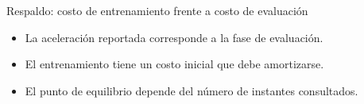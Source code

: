 \documentclass[10pt,aspectratio=169]{beamer}
\begin{document}
\begin{frame}{Respaldo: costo de entrenamiento frente a costo de evaluación}
  \begin{itemize}
    \item La aceleración reportada corresponde a la fase de evaluación.
    \item El entrenamiento tiene un costo inicial que debe amortizarse.
    \item El punto de equilibrio depende del número de instantes consultados.
  \end{itemize}
\end{frame}
\end{document}
